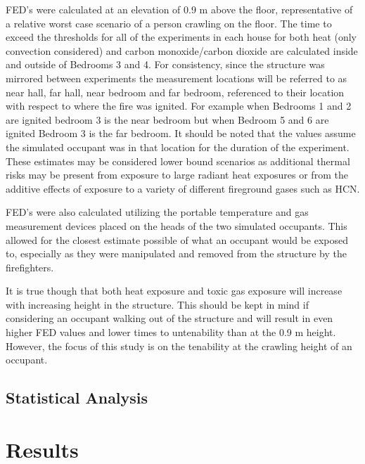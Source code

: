 \documentclass[12pt,oneside]{book}
\begin{document}
FED's were calculated at an elevation of 0.9 m above the floor, representative of a relative worst case scenario of a person crawling on the floor. The time to exceed the thresholds for all of the experiments in each house for both heat (only convection considered) and carbon monoxide/carbon dioxide are calculated inside and outside of Bedrooms 3 and 4.  For consistency, since the structure was mirrored between experiments the measurement locations will be referred to as near hall, far hall, near bedroom and far bedroom, referenced to their location with respect to where the fire was ignited.  For example when Bedrooms 1 and 2 are ignited bedroom 3 is the near bedroom but when Bedroom 5 and 6 are ignited Bedroom 3 is the far bedroom.  It should be noted that the values assume the simulated occupant was in that location for the duration of the experiment. These estimates may be considered lower bound scenarios as additional thermal risks may be present from exposure to large radiant heat exposures or from the additive effects of exposure to a variety of different fireground gases such as HCN.  

FED's were also calculated utilizing the portable temperature and gas measurement devices placed on the heads of the two simulated occupants.  This allowed for the closest estimate possible of what an occupant would be exposed to, especially as they were manipulated and removed from the structure by the firefighters.   

It is true though that both heat exposure and toxic gas exposure will increase with increasing height in the structure. This should be kept in mind if considering an occupant walking out of the structure and will result in even higher FED values and lower times to untenability than at the 0.9 m height. However, the focus of this study is on the tenability at the crawling height of an occupant.


\subsection{Statistical Analysis}

\section{Results}
\end{document}
